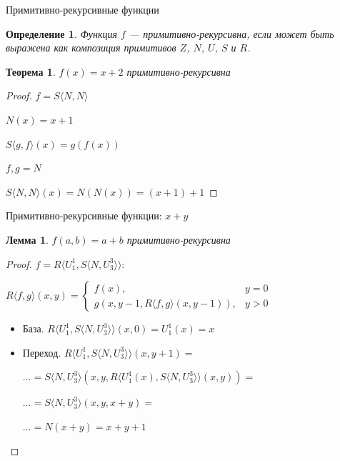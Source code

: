 \documentclass[aspectratio=169]{beamer}
\newtheorem{thm}{Теорема}[section]
\newtheorem{dfn}{Определение}[section]
\newtheorem{lmm}{Лемма}[section]
\begin{document}
\begin{frame}{Примитивно-рекурсивные функции}
\begin{dfn}Функция $f$ --- примитивно-рекурсивна, если может быть
выражена как композиция примитивов $Z$, $N$, $U$, $S$ и $R$.
\end{dfn}\pause

\begin{thm}
$f(x) = x+2$ примитивно-рекурсивна
\end{thm}\pause

\begin{proof}
$f = S \langle N,N \rangle$
\vspace{0.5cm}\pause

{\color{gray}
$N(x)=x+1$

$S\langle g,f\rangle (x) = g(f(x))$
}\pause

\vspace{0.5cm}
$f,g = N$\pause

$S\langle N,N\rangle (x) = N(N(x)) = (x+1)+1$
\end{proof}
\end{frame}

\begin{frame}{Примитивно-рекурсивные функции: $x+y$}
\begin{lmm}
$f(a,b) = a+b$ примитивно-рекурсивна
\end{lmm}
\begin{proof} $f = R \langle U^1_1, S\langle N, U^3_3\rangle \rangle$:
\vspace{0.2cm}\pause

{\color{gray}
$R\langle f,g\rangle(x,y)
=\left\{\begin{array}{ll} 
  f(x), &y=0\\
  g(x,y-1,R\langle f,g\rangle (x,y-1)), &y > 0
\end{array}\right.$ 


}\vspace{0.2cm}\pause

\begin{itemize}
\item База. $R\langle U^1_1, S\langle N, U^3_3\rangle \rangle(x,0) = U^1_1(x) = x$\pause

\item Переход. $R\langle U^1_1, S\langle N, U^3_3\rangle \rangle(x,y+1) = $\pause

$... = S\langle N, U^3_3\rangle (x,y,R\langle U^1_1(x), S\langle N, U^3_3\rangle\rangle (x,y) ) =$\pause

$... = S\langle N, U^3_3\rangle (x,y,x + y) = $\pause 

$... = N(x+y) = x+y+1$
\end{itemize}

\end{proof}
\end{frame}
\end{document}
